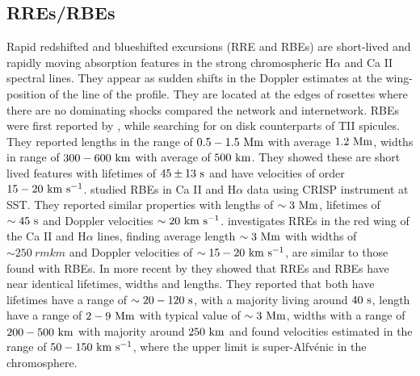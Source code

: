 \documentclass[12pt]{ociamthesis}
\newcommand{\Alfvenic}{Alfv\'{e}nic }
\newcommand{\kms}{~\rm{km ~s^{-1}}}
\newcommand{\np}{\\ \\}
\begin{document}
\subsection{RREs/RBEs}
\label{subsec:rbe}
Rapid redshifted and blueshifted excursions (RRE and RBEs) are short-lived and rapidly moving absorption features in the strong chromospheric H$\alpha$ and Ca II spectral lines. They appear as sudden shifts in the Doppler estimates at the wing-position of the line of the profile. They are located at the edges of rosettes where there are no dominating shocks compared the network and internetwork. RBEs were first reported by \cite{Langangen2008ApJ}, while searching for on disk counterparts of TII spicules. They reported lengths in the range of $0.5-1.5~\rm{Mm}$ with average $1.2~\rm{Mm}$, widths in range of $300-600~\rm{km}$ with average of $500~\rm{km}$. They showed these are short lived features with lifetimes of $45\pm13~\rm{s}$ and have velocities of order $15-20\kms$.\cite{Rouppe2009ApJ} studied RBEs in Ca II and H$\alpha$ data using CRISP instrument at SST. They reported similar properties with lengths of $\sim 3~\rm{Mm}$, lifetimes of $\sim 45~\rm{s}$ and Doppler velocities $\sim 20\kms$. \cite{Sekse2013ApJ76944S,Sekse2013ApJ764164S} investigates RREs in the red wing of the  Ca II and H$\alpha$ lines, finding average length $\sim 3~\rm{Mm}$ with widths of $\sim 250~rm{km}$ and Doppler velocities of $\sim 15-20\kms$, are similar to those found with RBEs.  In more recent by \cite{Kuridze2015ApJ80226K} they showed that RREs and RBEs have near identical lifetimes, widths and lengths. They reported that both have lifetimes have a range of $\sim 20-120~\rm{s}$, with a majority living around $40~\rm{s}$, length have a range of $2-9~\rm{Mm}$ with typical value of $\sim 3~\rm{Mm}$, widths with a range of $200-500~\rm{km}$ with majority around $250~\rm{km}$ and found velocities estimated in the range of $50-150\kms$, where the upper limit is super-\Alfvenic in the chromosphere. \np
%
\end{document}
